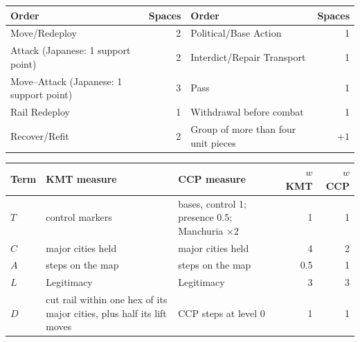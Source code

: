 \documentclass[11pt]{article}
\begin{document}
\par\medskip\noindent\begin{minipage}{\textwidth}
\centering\small
\begin{tabular}{@{}lr@{\qquad}lr@{}}
\toprule
Order & Spaces & Order & Spaces \\
\midrule
Move/Redeploy & 2 & Political/Base Action & 1 \\
Attack (Japanese: 1 support point) & 2 & Interdict/Repair Transport & 1 \\
Move--Attack (Japanese: 1 support point) & 3 & Pass & 1 \\
Rail Redeploy & 1 & Withdrawal before combat & 1 \\
Recover/Refit & 2 & Group of more than four unit pieces & $+1$ \\
\bottomrule
\end{tabular}
\label{tab:ordercost}
\end{minipage}

\par\medskip\noindent\begin{minipage}{\textwidth}
\centering\footnotesize
\begin{tabular}{@{}>{\raggedright\arraybackslash}p{}>{\raggedright\arraybackslash}p{}>{\raggedright\arraybackslash}p{}rr@{}}
\toprule
Term & KMT measure & CCP measure & $w$ KMT & $w$ CCP \\
\midrule
$T$ & control markers & bases, control 1; presence 0.5; Manchuria $\times 2$ & 1 & 1 \\
$C$ & major cities held & major cities held & 4 & 2 \\
$A$ & steps on the map & steps on the map & 0.5 & 1 \\
$L$ & Legitimacy & Legitimacy & 3 & 3 \\
$D$ & cut rail within one hex of its major cities, plus half its lift moves & CCP steps at level 0 & 1 & 1 \\
\bottomrule
\end{tabular}
\label{tab:weights}
\end{minipage}
\end{document}

